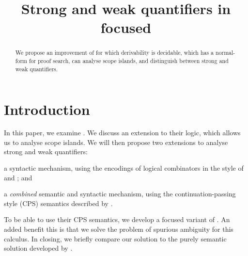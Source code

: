 \documentclass[10pt,a4paper]{llncs}
\begin{document}
\mainmatter
\title{Strong and weak quantifiers in focused \NLCL}
\maketitle

\begin{abstract}
  We propose an improvement of  \NLCL for which
  derivability is decidable, which has a normal-form for proof search,
  can analyse scope islands, and distinguish between strong and weak
  quantifiers.
\end{abstract}


\section{Introduction}
In this paper, we examine  \NLCL. We discuss an
extension to their logic, which allows us to analyse scope islands.
We will then propose two extensions to analyse strong and weak
quantifiers:
\begin{enumerate*}[label=(\arabic*)]
\item a syntactic mechanism, using the encodings of logical
  combinators in the style of \citet{finger2001} and
  \citet{barker2015}; and
\item a \emph{combined} semantic and syntactic mechanism, using the
  continuation-passing style (CPS) semantics described by
  \citet{moortgat2012}.
\end{enumerate*}
To be able to use their CPS semantics, we develop a focused variant of
\NLCL. An added benefit this is that we solve the problem of spurious
ambiguity for this calculus. In closing, we briefly compare our solution
to the purely semantic solution developed by \citet{kiselyov2014}.
\end{document}
